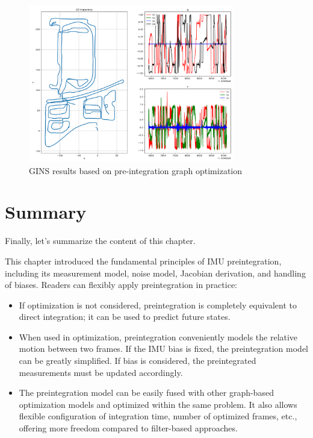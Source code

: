 \begin{figure}[!t]
	\centering
	\includegraphics[width=0.8\textwidth]{resources/preintegration/preintegration-gins-out.pdf}
	\caption{GINS results based on pre-integration graph optimization}
	\label{fig:preintegration-gins}
\end{figure}

\section{Summary}
Finally, let's summarize the content of this chapter.

This chapter introduced the fundamental principles of IMU preintegration, including its measurement model, noise model, Jacobian derivation, and handling of biases. Readers can flexibly apply preintegration in practice:

\begin{itemize}
	\item If optimization is not considered, preintegration is completely equivalent to direct integration; it can be used to predict future states.
	\item When used in optimization, preintegration conveniently models the relative motion between two frames. If the IMU bias is fixed, the preintegration model can be greatly simplified. If bias is considered, the preintegrated measurements must be updated accordingly.
	\item The preintegration model can be easily fused with other graph-based optimization models and optimized within the same problem. It also allows flexible configuration of integration time, number of optimized frames, etc., offering more freedom compared to filter-based approaches.
\end{itemize}

